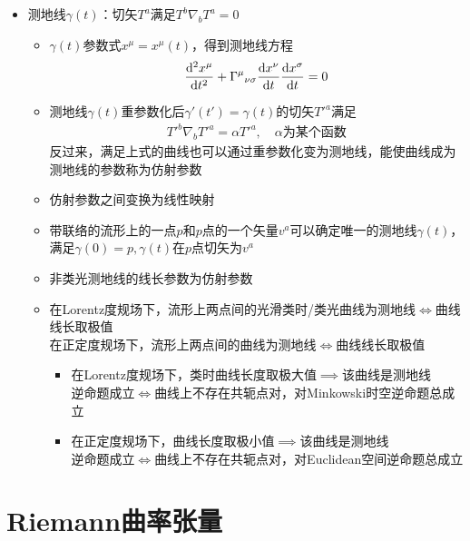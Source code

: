\begin{itemize}
    \item 测地线$\gamma(t)$：切矢$T^a$满足$T^b \nabla_b T^a=0$
    \begin{itemize}
        \item $\gamma(t)$参数式$x^\mu=x^\mu(t)$，得到测地线方程
        \begin{gather*}
            \frac{\mathrm{d} ^2 x^\mu}{\mathrm{d} t^2}+{\Gamma^{\mu}}_{\nu \sigma} \frac{\mathrm{d} x^{\nu}}{\mathrm{d} t} \frac{\mathrm{d} x^{\sigma}}{\mathrm{d} t}=0
        \end{gather*}
        \item 测地线$\gamma(t)$重参数化后$\gamma'(t')=\gamma(t)$的切矢$T'^a$满足
        \begin{gather*}
            T'^b \nabla_b T'^a=\alpha T'^a,\quad \alpha\text{为某个函数}
        \end{gather*}
        反过来，满足上式的曲线也可以通过重参数化变为测地线，能使曲线成为测地线的参数称为仿射参数
        \item 仿射参数之间变换为线性映射
        \item 带联络的流形上的一点$p$和$p$点的一个矢量$v^a$可以确定唯一的测地线$\gamma(t)$，满足$\gamma(0)=p,\gamma(t)$在$p$点切矢为$v^a$
        \item 非类光测地线的线长参数为仿射参数
        \item 在Lorentz度规场下，流形上两点间的光滑类时/类光曲线为测地线$\iff$曲线线长取极值\\
        在正定度规场下，流形上两点间的曲线为测地线$\iff$曲线线长取极值
        \begin{itemize}
            \item 在Lorentz度规场下，类时曲线长度取极大值$\implies$该曲线是测地线\\
            逆命题成立$\iff$曲线上不存在共轭点对，对Minkowski时空逆命题总成立
            \item 在正定度规场下，曲线长度取极小值$\implies$该曲线是测地线\\
            逆命题成立$\iff$曲线上不存在共轭点对，对Euclidean空间逆命题总成立
        \end{itemize}
    \end{itemize}
\end{itemize}

\section{Riemann曲率张量}

